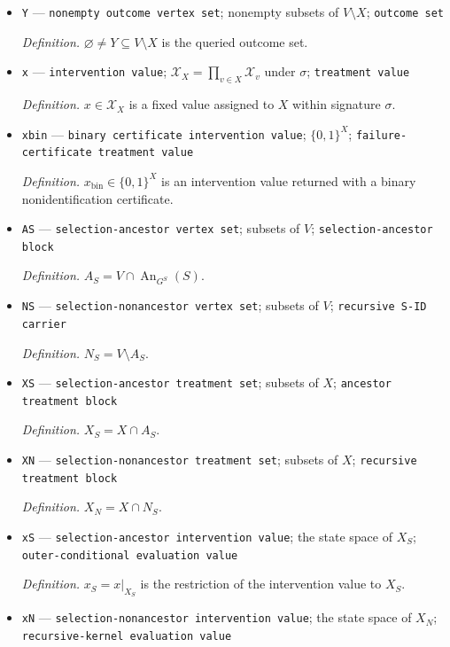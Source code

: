 \documentclass{article}
\begin{document}
\begin{itemize}
  \item \texttt{Y} --- \texttt{nonempty outcome vertex set}; nonempty subsets of \(V\setminus X\); \texttt{outcome set}
  \par\smallskip\noindent\emph{Definition.} \(\varnothing\ne Y\subseteq V\setminus X\) is the queried outcome set.
  \item \texttt{x} --- \texttt{intervention value}; \(\mathcal X_X=\prod_{v\in X}\mathcal X_v\) under \(\sigma\); \texttt{treatment value}
  \par\smallskip\noindent\emph{Definition.} \(x\in\mathcal X_X\) is a fixed value assigned to \(X\) within signature \(\sigma\).
  \item \texttt{xbin} --- \texttt{binary certificate intervention value}; \(\{0,1\}^{X}\); \texttt{failure-\allowbreak{}certificate treatment value}
  \par\smallskip\noindent\emph{Definition.} \(x_{\mathrm{bin}}\in\{0,1\}^{X}\) is an intervention value returned with a binary nonidentification certificate.
  \item \texttt{AS} --- \texttt{selection-\allowbreak{}ancestor vertex set}; subsets of \(V\); \texttt{selection-\allowbreak{}ancestor block}
  \par\smallskip\noindent\emph{Definition.} \(A_S=V\cap\operatorname{An}_{G^S}(S)\).
  \item \texttt{NS} --- \texttt{selection-\allowbreak{}nonancestor vertex set}; subsets of \(V\); \texttt{recursive S-\allowbreak{}ID carrier}
  \par\smallskip\noindent\emph{Definition.} \(N_S=V\setminus A_S\).
  \item \texttt{XS} --- \texttt{selection-\allowbreak{}ancestor treatment set}; subsets of \(X\); \texttt{ancestor treatment block}
  \par\smallskip\noindent\emph{Definition.} \(X_S=X\cap A_S\).
  \item \texttt{XN} --- \texttt{selection-\allowbreak{}nonancestor treatment set}; subsets of \(X\); \texttt{recursive treatment block}
  \par\smallskip\noindent\emph{Definition.} \(X_N=X\cap N_S\).
  \item \texttt{xS} --- \texttt{selection-\allowbreak{}ancestor intervention value}; the state space of \(X_S\); \texttt{outer-\allowbreak{}conditional evaluation value}
  \par\smallskip\noindent\emph{Definition.} \(x_S=x|_{X_S}\) is the restriction of the intervention value to \(X_S\).
  \item \texttt{xN} --- \texttt{selection-\allowbreak{}nonancestor intervention value}; the state space of \(X_N\); \texttt{recursive-\allowbreak{}kernel evaluation value}

\end{itemize}
\end{document}
